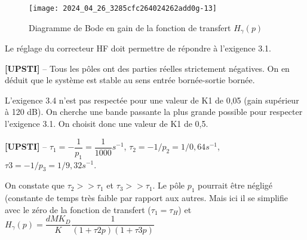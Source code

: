 
\begin{figure}[!h]
\centering
\texttt{[image: 2024\_04\_26\_3285cfc264024262add0g-13]}
\caption{\label{ccmp2023_fig_12} Diagramme de Bode en gain de la fonction de transfert $H_{\gamma}(p)$}
\end{figure}

Le réglage du correcteur HF doit permettre de répondre à l'exigence 3.1.
\fi

\ifprof
\begin{corrige}
\textbf{[UPSTI]} --
Tous les pôles ont des parties réelles strictement négatives. On en déduit que le système est stable au sens entrée bornée-sortie bornée.

L’exigence 3.4 n’est pas respectée pour une valeur de K1 de 0,05 (gain supérieur à 120 dB). On cherche une bande passante la plus grande possible pour respecter l’exigence 3.1. On choisit donc une valeur de K1 de 0,5.
\end{corrige}
\else
\fi


\ifprof
\begin{corrige}%
\textbf{[UPSTI]} -- 
$\tau_1=-\dfrac{1}{p_1} =\dfrac{1}{1000}\si{s^{-1}}$,  $\tau_2=-1/p_2 =1/0,64 \si{s^{-1}}$,  $\tau3=-1/p_3 =1/9,32\si{s^{-1}}$. 

On constate que $\tau_2 >> \tau_1$ et $\tau_3>> \tau_1$. Le pôle $p_1$ pourrait être négligé (constante de temps très faible par rapport aux autres. Mais ici il se simplifie avec le zéro de la fonction de transfert ($\tau_1=\tau_H$) et 
$H_{\gamma} (p)= \dfrac{dMK_D}{K} \dfrac{ 1}{(1+\tau2 p)(1+\tau3 p)}$

\end{corrige}
\else
\fi


